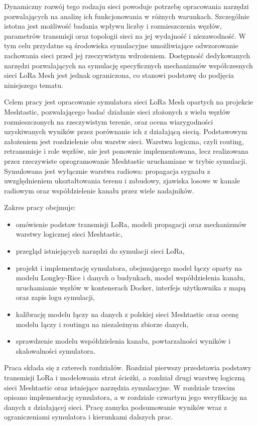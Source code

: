 \documentclass[12pt,a4paper,twoside]{report}
\theoremstyle{definition} %
\begin{document}
Dynamiczny rozwój tego rodzaju sieci powoduje potrzebę opracowania narzędzi pozwalających na analizę ich funkcjonowania w różnych warunkach. Szczególnie istotna jest możliwość badania wpływu liczby i rozmieszczenia węzłów, parametrów transmisji oraz topologii sieci na jej wydajność i niezawodność. W tym celu przydatne są środowiska symulacyjne umożliwiające odwzorowanie zachowania sieci przed jej rzeczywistym wdrożeniem. Dostępność dedykowanych narzędzi pozwalających na symulację specyficznych mechanizmów współczesnych sieci LoRa Mesh jest jednak ograniczona, co stanowi podstawę do podjęcia niniejszego tematu.

Celem pracy jest opracowanie symulatora sieci LoRa Mesh opartych na projekcie Meshtastic, pozwalającego badać działanie sieci złożonych z wielu węzłów rozmieszczonych na rzeczywistym terenie, oraz ocena wiarygodności uzyskiwanych wyników przez porównanie ich z działającą siecią. Podstawowym założeniem jest rozdzielenie obu warstw sieci. Warstwa logiczna, czyli routing, retransmisje i role węzłów, nie jest ponownie implementowana, lecz realizowana przez rzeczywiste oprogramowanie Meshtastic uruchamiane w trybie symulacji. Symulowana jest wyłącznie warstwa radiowa: propagacja sygnału z uwzględnieniem ukształtowania terenu i zabudowy, zjawiska losowe w kanale radiowym oraz współdzielenie kanału przez wiele nadajników.

Zakres pracy obejmuje:
\begin{itemize}
\item omówienie podstaw transmisji LoRa, modeli propagacji oraz mechanizmów warstwy logicznej sieci Meshtastic,
\item przegląd istniejących narzędzi do symulacji sieci LoRa,
\item projekt i implementację symulatora, obejmującego model łączy oparty na modelu Longley-Rice i danych o budynkach, model współdzielenia kanału, uruchamianie węzłów w kontenerach Docker, interfejs użytkownika z mapą oraz zapis logu symulacji,
\item kalibrację modelu łączy na danych z polskiej sieci Meshtastic oraz ocenę modelu łączy i routingu na niezależnym zbiorze danych,
\item sprawdzenie modelu współdzielenia kanału, powtarzalności wyników i skalowalności symulatora.
\end{itemize}

Praca składa się z czterech rozdziałów. Rozdział pierwszy przedstawia podstawy transmisji LoRa i modelowania strat ścieżki, a rozdział drugi warstwę logiczną sieci Meshtastic oraz istniejące narzędzia symulacyjne. W rozdziale trzecim opisano implementację symulatora, a w rozdziale czwartym jego weryfikację na danych z działającej sieci. Pracę zamyka podsumowanie wyników wraz z ograniczeniami symulatora i kierunkami dalszych prac.
	
\end{document}

